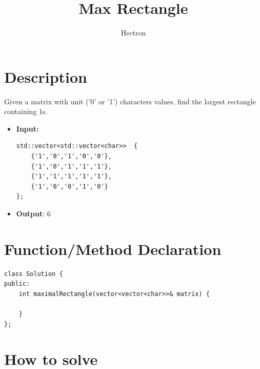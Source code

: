 \documentclass[a4paper,11pt]{article}
\author{Hectron}
\title{Max Rectangle}
\newcommand{\newpagex}{
    \newpage
    \vspace*{-7\baselineskip} %
}
\begin{document}
\maketitle

\tableofcontents

\newpagex
    \noindent

\section{Description}
    
Given a matrix with unit ('0' or '1') characters values, find the largest rectangle containing 1s. \\
\begin{itemize}
\item \textbf{Input:} 
\begin{verbatim}
std::vector<std::vector<char>>  { 
    {'1','0','1','0','0'},
    {'1','0','1','1','1'},
    {'1','1','1','1','1'},
    {'1','0','0','1','0'}
};
\end{verbatim}

\item \textbf{Output}: \newline  \textmd{6}
\end{itemize}

\section{Function/Method Declaration} 
\footnotesize
\begin{verbatim}
class Solution {
public:
    int maximalRectangle(vector<vector<char>>& matrix) {
        
    }
};
\end{verbatim}

\section{How to solve}
    
\end{document}
